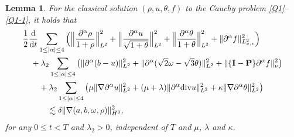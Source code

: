 \documentclass[reqno,11pt]{amsart}
\theoremstyle{plain}
\newtheorem{lem}[thm]{Lemma}
\numberwithin{equation}{section}
\begin{document}
 
\begin{lem}\label{L3.2}
For the  classical solution $(\rho, u,\theta,f)$ to the Cauchy problem \eqref{Q1}--\eqref{Q1-1}, it holds that 
\begin{align}\label{G3.9}
&\frac{1}{2}\frac{\rm d}{{\rm d}t}\sum_{1\leq|\alpha|\leq
4}\Big(\Big\|\frac{\partial^\alpha\rho}{1+\rho}\Big\|_{L^2}^2+\Big\|\frac{\partial^\alpha u}{\sqrt{1+\theta}}\Big\|_{L^2}^{2}+\Big\|\frac{\partial^\alpha\theta}{1+\theta}\Big\|_{L^2}^2 +\|\partial^\alpha f\|_{L_{x,v}^{2}}^2\Big)\nonumber\\
&\quad+\lambda_2\sum_{1\leq |\alpha|\leq 4}\big(\|\partial^\alpha(b-u)\|_{L^2}^{2}
+\|\partial^\alpha(\sqrt{2}\omega-\sqrt{3}\theta)\|_{L^2}^2+\|\{\mathbf{I}-\mathbf{P}\}\partial^\alpha f\|_{\nu}^{2}\big)\nonumber\\
&\quad \quad+\lambda_2\sum_{1\leq |\alpha|\leq 4} \big(\mu \|\nabla\partial^\alpha u\|_{L^2}^2+(\mu+\lambda) \|\partial^\alpha {\rm div} u\|_{L^2}^2+\kappa\|\nabla\partial^\alpha \theta\|_{L^2}^2\big)\nonumber\\ 
 &\quad\quad\quad \lesssim \delta\|\nabla(a,b,\omega,\rho)\|_{H^3}^2,
\end{align}
for any $0 \leq t < T$ and $\lambda_2>0$,   independent of $T$ and $\mu$, $\lambda$ and
$\kappa$. 
\end{lem} 
\end{document}
